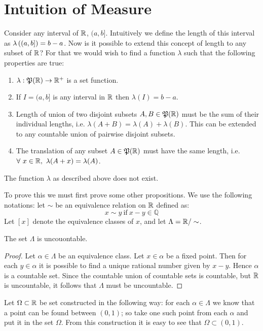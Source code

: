 \section{Intuition of Measure}
Consider any interval of $\mathbb{R}$, $(a,b]$. Intuitively we define the length of this interval as $\lambda\left((a,b]\right) = b-a$. Now is it possible to extend this concept of length to any subset of $\mathbb{R}$? For that we would wish to find a function $\lambda$ such that the following properties are true:
\begin{enumerate}
  \item $\lambda: \mathfrak{P} (\mathbb{R})\to \mathbb{R}^{+}$ is a set function.
  \item If $I = (a,b]$ is any interval in $\mathbb{R}$ then $\lambda(I) = b-a$.
  \item Length of union of two disjoint subsets $A, B\in \mathfrak{P}(\mathbb{R})$ must be the sum of their individual lengths, i.e. $\lambda(A+B) = \lambda(A)+\lambda(B)$. This can be extended to any countable union of pairwise disjoint subsets. 
  \item The translation of any subset $A\in \mathfrak{P}(\mathbb{R})$ must have the same length, i.e. $\forall\ x\in \mathbb{R},\ \lambda(A+x) = \lambda(A)$. 
\end{enumerate}
\begin{conjecture}
  The function $\lambda$ as described above does not exist.
  \label{con:not-exist}
\end{conjecture}
To prove this we must first prove some other propositions. We use the following notations: let $\sim$ be an equivalence relation on $\mathbb{R}$ defined as:
  \[x\sim y\ \text{if}\ x-y\in\mathbb{Q}\]
  Let $[x]$ denote the equivalence classes of $x$, and let $\Lambda = \mathbb{R}/\sim$. 
\begin{proposition}
 The set $\Lambda$ is uncouontable.  
 \label{uncountable}
\end{proposition}
\begin{proof}
  Let $\alpha\in\Lambda$ be an equivalence class. Let $x\in\alpha$ be a fixed point. Then for each $y\in\alpha$ it is possible to find a unique rational number given by $x-y$. Hence $\alpha$ is a countable set. Since the countable union of countable sets is countable, but $\mathbb{R}$ is uncountable, it follows that $\Lambda$ must be uncountable. 
\end{proof}
Let $\Omega\subset \mathbb{R}$ be set constructed in the following way: for each $\alpha\in\Lambda$ we know that a point can be found between $(0,1)$; so take one such point from each $\alpha$ and put it in the set $\Omega$. From this construction it is easy to see that $\Omega\subset (0,1)$.
